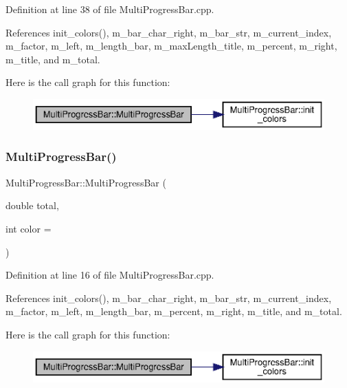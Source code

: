 Definition at line 38 of file Multi\+Progress\+Bar.\+cpp.



References init\+\_\+colors(), m\+\_\+bar\+\_\+char\+\_\+right, m\+\_\+bar\+\_\+str, m\+\_\+current\+\_\+index, m\+\_\+factor, m\+\_\+left, m\+\_\+length\+\_\+bar, m\+\_\+max\+Length\+\_\+title, m\+\_\+percent, m\+\_\+right, m\+\_\+title, and m\+\_\+total.

Here is the call graph for this function\+:\nopagebreak
\begin{figure}[H]
\begin{center}
\leavevmode
\includegraphics[width=350pt]{classMultiProgressBar_aaab5d64069e511a0c5c5f029936506d7_aaab5d64069e511a0c5c5f029936506d7_cgraph}
\end{center}
\end{figure}
\mbox{\label{classMultiProgressBar_a192362044eb0b1f9955a6bd824300a7c_a192362044eb0b1f9955a6bd824300a7c}} 
\subsubsection{Multi\+Progress\+Bar()\hspace{0.1cm}{\footnotesize\ttfamily [2/2]}}
{\footnotesize\ttfamily Multi\+Progress\+Bar\+::\+Multi\+Progress\+Bar (\begin{DoxyParamCaption}\item[{double}]{total,  }\item[{int}]{color = {} }\end{DoxyParamCaption})}



Definition at line 16 of file Multi\+Progress\+Bar.\+cpp.



References init\+\_\+colors(), m\+\_\+bar\+\_\+char\+\_\+right, m\+\_\+bar\+\_\+str, m\+\_\+current\+\_\+index, m\+\_\+factor, m\+\_\+left, m\+\_\+length\+\_\+bar, m\+\_\+percent, m\+\_\+right, m\+\_\+title, and m\+\_\+total.

Here is the call graph for this function\+:\nopagebreak
\begin{figure}[H]
\begin{center}
\leavevmode
\includegraphics[width=350pt]{classMultiProgressBar_a192362044eb0b1f9955a6bd824300a7c_a192362044eb0b1f9955a6bd824300a7c_cgraph}
\end{center}
\end{figure}
\mbox{\label{classMultiProgressBar_aa6447c0d66c0f765f11c920863fa71ad_aa6447c0d66c0f765f11c920863fa71ad}} 
